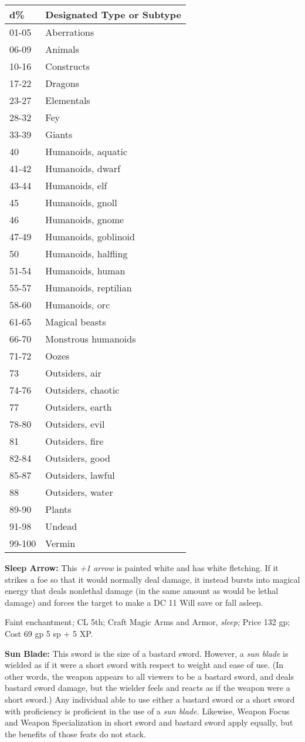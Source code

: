 \documentclass{article}
\begin{document}
\begin{tabular}{|>{\raggedright}p{34pt}|>{\raggedright}p{125pt}|}
\hline
d\textbf{\%} & D\textbf{esignated Type or Subtype}\tabularnewline
\hline
01-05 & Aberrations\tabularnewline
\hline
06-09 & Animals\tabularnewline
\hline
10-16 & Constructs\tabularnewline
\hline
17-22 & Dragons\tabularnewline
\hline
23-27 & Elementals\tabularnewline
\hline
28-32 & Fey\tabularnewline
\hline
33-39 & Giants\tabularnewline
\hline
40 & Humanoids, aquatic\tabularnewline
\hline
41-42 & Humanoids, dwarf\tabularnewline
\hline
43-44 & Humanoids, elf\tabularnewline
\hline
45 & Humanoids, gnoll\tabularnewline
\hline
46 & Humanoids, gnome\tabularnewline
\hline
47-49 & Humanoids, goblinoid\tabularnewline
\hline
50 & Humanoids, halfling\tabularnewline
\hline
51-54 & Humanoids, human\tabularnewline
\hline
55-57 & Humanoids, reptilian\tabularnewline
\hline
58-60 & Humanoids, orc\tabularnewline
\hline
61-65 & Magical beasts\tabularnewline
\hline
66-70 & Monstrous humanoids\tabularnewline
\hline
71-72 & Oozes\tabularnewline
\hline
73 & Outsiders, air\tabularnewline
\hline
74-76 & Outsiders, chaotic\tabularnewline
\hline
77 & Outsiders, earth\tabularnewline
\hline
78-80 & Outsiders, evil\tabularnewline
\hline
81 & Outsiders, fire\tabularnewline
\hline
82-84 & Outsiders, good\tabularnewline
\hline
85-87 & Outsiders, lawful\tabularnewline
\hline
88 & Outsiders, water\tabularnewline
\hline
89-90 & Plants\tabularnewline
\hline
91-98 & Undead\tabularnewline
\hline
99-100 & Vermin\tabularnewline
\hline
\end{tabular}

\textbf{Sleep Arrow:} This \textit{+1 arrow }is painted white and has white fletching. 
If it strikes a foe so that it would normally deal damage, it instead bursts into 
magical energy that deals nonlethal damage (in the same amount as would be lethal 
damage) and forces the target to make a DC 11 Will save or fall asleep.

Faint enchantment\textit{; }CL 5th; Craft Magic Arms and Armor, \textit{sleep; 
}Price 132 gp; Cost 69 gp 5 sp + 5 XP.

\textbf{Sun Blade:} This sword is the size of a bastard sword. However, a \textit{sun 
blade }is wielded as if it were a short sword with respect to weight and ease of 
use. (In other words, the weapon appears to all viewers to be a bastard sword, 
and deals bastard sword damage, but the wielder feels and reacts as if the weapon 
were a short sword.) Any individual able to use either a bastard sword or a short 
sword with proficiency is proficient in the use of a \textit{sun blade. }Likewise, 
Weapon Focus and Weapon Specialization in short sword and bastard sword apply equally, 
but the benefits of those feats do not stack.
\end{document}
